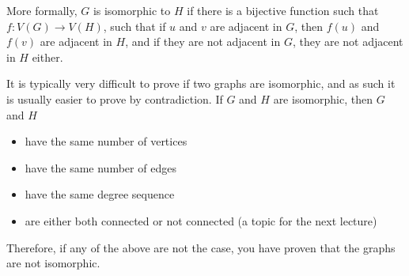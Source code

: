 More formally, $G$ is isomorphic to $H$ if there is a bijective function such that $f: V(G) \rightarrow V(H)$, such that
 if $u$ and $v$ are adjacent in $G$, then $f(u)$ and $f(v)$ are adjacent in $H$, and if they are not adjacent in $G$,
 they are not adjacent in $H$ either.

It is typically very difficult to prove if two graphs are isomorphic, and as such it is usually easier to prove by
 contradiction. If $G$ and $H$ are isomorphic, then $G$ and $H$
\begin{itemize}
  \item have the same number of vertices
  \item have the same number of edges
  \item have the same degree sequence
  \item are either both connected or not connected (a topic for the next lecture)
\end{itemize}
Therefore, if any of the above are not the case, you have proven that the graphs are not isomorphic.